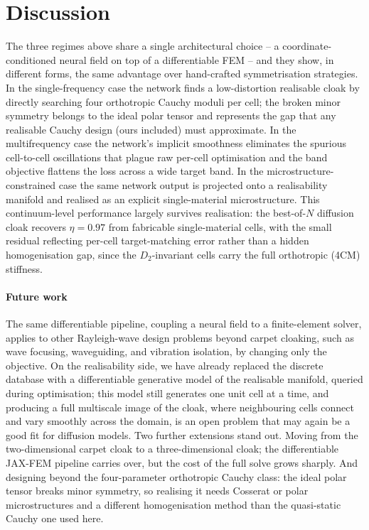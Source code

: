 \documentclass[preprint,12pt]{elsarticle}
\begin{document}
\section{Discussion}\label{sec:discussion}

    The three regimes above share a single architectural choice -- a
coordinate-conditioned neural field on top of a differentiable FEM --
and they show, in different forms, the same advantage over hand-crafted
symmetrisation strategies. In the single-frequency case the network finds a low-distortion realisable
cloak by directly searching four orthotropic Cauchy moduli per cell; the
broken minor symmetry belongs to the ideal polar tensor and represents the
gap that any realisable Cauchy design (ours included) must approximate. In
the multifrequency case the network's implicit smoothness eliminates
the spurious cell-to-cell oscillations that plague raw per-cell
optimisation and the band objective flattens the loss across a wide
target band. In the microstructure-constrained case the same network
output is projected onto a realisability manifold and realised as an
explicit single-material microstructure. This continuum-level performance
largely survives realisation: the best-of-$N$ diffusion cloak recovers
$\eta=0.97$ from fabricable single-material cells, with the small residual
reflecting per-cell target-matching error rather than a hidden
homogenisation gap, since the $D_2$-invariant cells carry the full
orthotropic (4CM) stiffness.


\paragraph{Future work} The same differentiable pipeline, coupling a
neural field to a finite-element solver, applies to other Rayleigh-wave
design problems beyond carpet cloaking, such as wave focusing,
waveguiding, and vibration isolation, by changing only the objective. On
the realisability side, we have already replaced the discrete database
with a differentiable generative model of the realisable manifold,
queried during optimisation; this model still generates one unit cell at a
time, and producing a full multiscale image of the cloak, where
neighbouring cells connect and vary smoothly across the domain, is an
open problem that may again be a good fit for diffusion models. Two further extensions
stand out. Moving from the two-dimensional carpet
cloak to a three-dimensional cloak; the differentiable JAX-FEM pipeline
carries over, but the cost of the full solve grows sharply. And
designing beyond the four-parameter orthotropic Cauchy class: the ideal
polar tensor breaks minor symmetry, so realising it needs Cosserat or
polar microstructures and a different homogenisation method than the
quasi-static Cauchy one used here.
\end{document}
